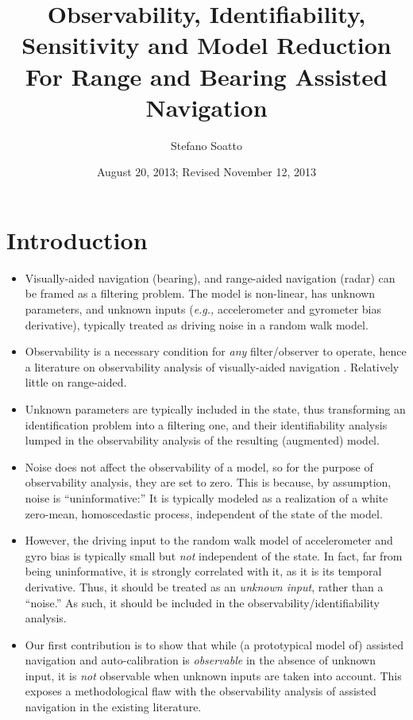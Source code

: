 \documentclass[]{article}
\begin{document}
\title{\bf Observability, Identifiability, Sensitivity and Model Reduction For Range and Bearing Assisted Navigation} 
\author{Stefano Soatto}
\date{August 20, 2013; Revised November 12, 2013}

\maketitle

\begin{abstract}
\end{abstract}

\tableofcontents


\section{Introduction}
\begin{itemize}
\item Visually-aided navigation (bearing), and range-aided navigation (radar) can be framed as a filtering problem. The model is non-linear, has unknown parameters, and unknown inputs ({\em e.g.,} accelerometer and gyrometer bias derivative), typically treated as driving noise in a random walk model.
\item Observability is a necessary condition for {\em any} filter/observer to operate, hence a literature on observability analysis of visually-aided navigation \cite{kellyS09,mourikisR07,jonesS07}. Relatively little on range-aided. 
\item Unknown parameters are typically included in the state, thus transforming an identification problem into a filtering one, and their identifiability analysis lumped in the observability analysis of the resulting (augmented) model.
\item Noise does not affect the observability of a model, so for the purpose of observability analysis, they are set to zero. This is because, by assumption, noise is ``uninformative:'' It is typically modeled as a realization of a white zero-mean, homoscedastic process, independent of the state of the model.
\item However, the driving input to the random walk model of accelerometer and gyro bias is typically small but {\em not} independent of the state. In fact, far from being uninformative, it is strongly correlated with it, as it is its temporal derivative. Thus, it should be treated as an {\em unknown input}, rather than a ``noise.'' As such, it should be included in the observability/identifiability analysis. 
\item Our first contribution is to show that while (a prototypical model of) assisted navigation and auto-calibration is {\em observable} in the absence of unknown input, it is {\em not} observable when unknown inputs are taken into account. This exposes a methodological flaw with the observability analysis of assisted navigation in the existing literature.

\end{itemize}
\end{document}
